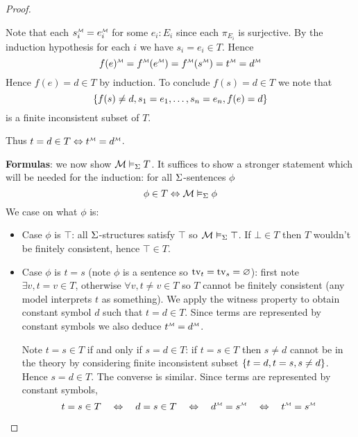 \begin{proof}
        \begin{backward} 
            Note that each $\mmintp{s_i} = \mmintp{e_i}$ 
            for some $e_i : E_i$ since each $\pi_{E_i}$ is surjective.
            By the induction hypothesis for each $i$ we have 
            $s_i = e_i \in T$.
            Hence 
            \[
                \mmintp{f(e)}
                = \mmintp{f}(\mmintp{e}) 
                = \mmintp{f}(\mmintp{s}) 
                = \mmintp{t} = \mmintp{d}
            \]
            Hence $f(e) = d \in T$ by induction.
            To conclude $f(s) = d \in T$ we note that 
            \[\left\{f(s) \ne d, s_1 = e_1,\dots,s_n = e_n, f(e) = d\right\}\]
            is a finite inconsistent subset of $T$.
        \end{backward}
    Thus $t = d \in T \iff \mmintp{t} = \mmintp{d}$.

    \textbf{Formulas}:
    we now show $\mathcal{M} \vDash_{\Sigma} T$. 
    It suffices to show a stronger statement
    which will be needed for the induction:
    for all $\Sigma$-sentences $\phi$
    \[
        \phi \in T \Leftrightarrow \mathcal{M} \vDash_{\Sigma} \phi
    \]
    We case on what $\phi$ is:
    \begin{itemize}
        \item Case $\phi$ is $\top$:
        all $\Sigma$-structures satisfy $\top$
        so $\mathcal{M} \vDash_{\Sigma} \top$.
        If $\bot \in T$ then $T$ wouldn't be finitely consistent, 
        hence $\top \in T$.
        \item Case $\phi$ is $t = s$ (note $\phi$ is a sentence so 
        $\textrm{tv}_{t} = \textrm{tv}_{s} = \varnothing$): 
        first note $\exists v, t = v \in T$,
        otherwise $\forall v, t \ne v \in T$ so
        $T$ cannot be finitely consistent 
        (any model interprets $t$ as something).
        We apply the witness property to 
        obtain constant symbol $d$ such that
        $t = d \in T$.
        Since terms are represented by constant symbols
        we also deduce $\mmintp{t} = \mmintp{d}$.

        Note $t = s \in T$ if and only if $s = d \in T$:
        if $t = s \in T$ then $s \ne d$ cannot be in the theory 
        by considering finite inconsistent subset $\left\{t = d, t = s, s \ne d\right\}$.
        Hence $s = d \in T$. The converse is similar.
        Since terms are represented by constant symbols, 
        \[
            t = s \in T \quad \iff \quad
            d = s \in T \quad \iff \quad 
            \mmintp{d} = \mmintp{s} \quad \iff \quad 
            \mmintp{t} = \mmintp{s}
        \]


\end{itemize}
\end{proof}
